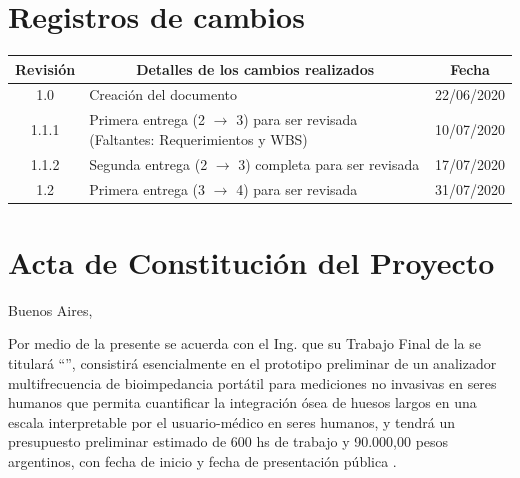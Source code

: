 \documentclass[11pt]{charter}
\begin{document}
\maketitle
\thispagestyle{empty}
\pagebreak


\thispagestyle{empty}
{\setlength{\parskip}{0pt}
\tableofcontents{}
}
\pagebreak


\section{Registros de cambios}
\label{sec:registro}


\begin{table}[ht]
\label{tab:registro}
\centering

\begin{tabularx}{\linewidth}{@{}|c|X|c|@{}}
\hline
\rowcolor[HTML]{C0C0C0} 
Revisión & \multicolumn{1}{c|}{\cellcolor[HTML]{C0C0C0}Detalles de los cambios realizados} & Fecha      \\ \hline
1.0      & Creación del documento                                                          & 22/06/2020 \\ \hline
1.1.1      & Primera entrega (2 $\rightarrow$ 3) para ser revisada (Faltantes: Requerimientos y WBS) & 10/07/2020 \\ \hline
1.1.2      & Segunda entrega (2 $\rightarrow$ 3) completa para ser revisada  & 17/07/2020 \\ \hline
1.2      & Primera entrega (3 $\rightarrow$ 4) para ser revisada  & 31/07/2020 \\ \hline

\end{tabularx}
\end{table}

\pagebreak


\section{Acta de Constitución del Proyecto}
\label{sec:acta}

\begin{flushright}
Buenos Aires, \fechaInicioName
\end{flushright}

\vspace{2cm}

Por medio de la presente se acuerda con el Ing. \authorname\hspace{1px} que su Trabajo Final de la \degreename\hspace{1px} se titulará ``\ttitle'', consistirá esencialmente en el prototipo preliminar de un analizador multifrecuencia de bioimpedancia portátil para mediciones no invasivas en seres humanos que permita cuantificar la integración ósea de huesos largos en una escala interpretable por el usuario-médico en seres humanos, y tendrá un presupuesto preliminar estimado de 600 hs de trabajo y 90.000,00 pesos argentinos, con fecha de inicio \fechaInicioName\hspace{1px} y fecha de presentación pública \fechaFinalName.
\end{document}
